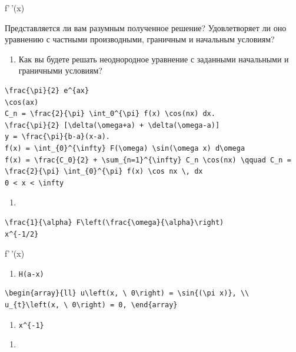 \documentclass[
  ukrainian,
]{article}
\providecommand{\tightlist}{%
  \setlength{\itemsep}{0pt}\setlength{\parskip}{0pt}}
\begin{document}
f'\,'(x)

Представляется ли вам разумным полученное решение? Удовлетворяет ли оно
уравнению с частными производными, граничным и начальным условиям?

\begin{enumerate}
\def\labelenumi{\arabic{enumi}.}
\setcounter{enumi}{6}
\tightlist
\item
  Как вы будете решать неоднородное уравнение с заданными начальными и
  граничными условиям?
\end{enumerate}

\begin{verbatim}
\frac{\pi}{2} e^{ax}
\cos(ax)
C_n = \frac{2}{\pi} \int_0^{\pi} f(x) \cos(nx) dx.
\frac{\pi}{2} [\delta(\omega+a) + \delta(\omega-a)]
y = \frac{\pi}{b-a}(x-a).
f(x) = \int_{0}^{\infty} F(\omega) \sin(\omega x) d\omega
f(x) = \frac{C_0}{2} + \sum_{n=1}^{\infty} C_n \cos(nx) \qquad C_n = \frac{2}{\pi} \int_{0}^{\pi} f(x) \cos nx \, dx
0 < x < \infty
\end{verbatim}

\begin{enumerate}
\def\labelenumi{\arabic{enumi}.}
\tightlist
\item
\end{enumerate}

\begin{verbatim}
\frac{1}{\alpha} F\left(\frac{\omega}{\alpha}\right)
x^{-1/2}
\end{verbatim}

f'\,'(x)

\begin{enumerate}
\def\labelenumi{\arabic{enumi}.}
\setcounter{enumi}{4}
\tightlist
\item
  \texttt{H(a-x)}
\end{enumerate}

\begin{verbatim}
\begin{array}{ll} u\left(x, \ 0\right) = \sin{(\pi x)}, \\ u_{t}\left(x, \ 0\right) = 0, \end{array}
\end{verbatim}

\begin{enumerate}
\def\labelenumi{\arabic{enumi}.}
\setcounter{enumi}{5}
\tightlist
\item
  \texttt{x\^{}\{-1\}}
\end{enumerate}

\begin{enumerate}
\def\labelenumi{\alph{enumi})}
\tightlist
\item
\end{enumerate}
\end{document}
